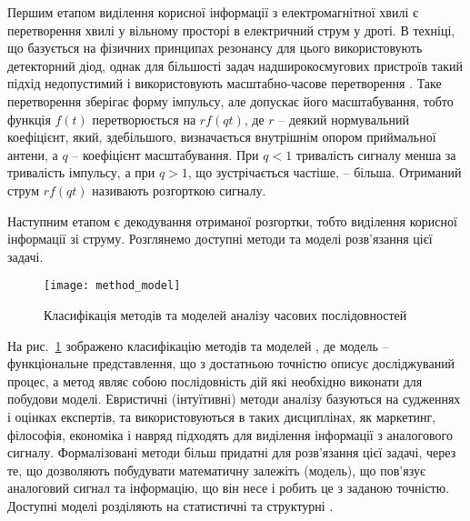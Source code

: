 
Першим етапом виділення корисної інформації з електромагнітної хвилі є 
перетворення хвилі у вільному просторі в електричний струм у дроті. В техніці, 
що базується на фізичних принципах резонансу для цього використовують 
детекторний діод, однак для більшості задач надширокосмугових пристроїв 
такий підхід недопустимий і використовують масштабно-часове перетворення
\cite{imp:Lazorenko2009}. Таке перетворення зберігає форму імпульсу, але 
допускає його масштабування, тобто функція $ f(t) $ перетворюється на 
$ r f(qt) $, де $ r $ -- деякий нормувальний коефіцієнт, який, здебільшого, 
визначається внутрішнім опором приймальної антени, а $ q $ -- коефіцієнт 
масштабування. При $ q < 1 $ тривалість сигналу менша за тривалість імпульсу, 
а при $ q > 1 $, що зустрічається частіше, -- більша. Отриманий струм 
$ r f(qt) $ називають розгорткою сигналу.

Наступним етапом є декодування отриманої розгортки, тобто виділення корисної 
інформації зі струму. Розглянемо доступні методи та моделі розв'язання цієї 
задачі.

\begin{figure}[htbp] \begin{center}
\texttt{[image: method\_model]}
\caption{Класифікація методів та моделей аналізу часових послідовностей} 
\label{fig:method_model}
\end{center} \end{figure}

На рис.~\ref{fig:method_model} зображено класифікацію методів та моделей 
\cite{imp:Chuchueva2012}, де модель -- функціональне представлення, що з 
достатньою точністю описує досліджуваний процес, а метод являє собою 
послідовність дій які необхідно виконати для побудови моделі. Евристичні 
(інтуїтивні) методи аналізу базуються на судженнях і оцінках експертів, 
та використовуються в таких дисциплінах, як маркетинг, філософія, економіка 
і навряд підходять для виділення інформації з аналогового 
сигналу. Формалізовані методи більш придатні для розв'язання цієї задачі,
через те, що дозволяють побудувати математичну залежіть (модель), що 
пов'язує аналоговий сигнал та інформацію, що він несе і робить це з 
заданою точністю. Доступні моделі розділяють на статистичні та структурні 
\cite{imp:Chuchueva2012}. 

